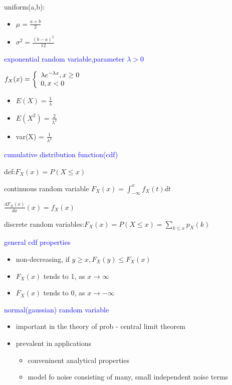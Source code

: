 uniform(a,b):
\begin{itemize}
    \item $\mu=\frac{a+b}{2}$
    \item $\sigma^2=\frac{(b-a)^2}{12}$
\end{itemize}

\textcolor{blue}{exponential random variable,parameter $\lambda> 0$}

$f_X(x)=\left\{ \begin{array}[pos]{l}
    \lambda e^{-\lambda x},x\geq 0\\
    0,x <0
\end{array}\right.$

\begin{itemize}
    \item $E(X)=\frac{1}{\lambda}$
    \item $E(X^2)=\frac{2}{\lambda^2}$
    \item var(X) = $\frac{1}{\lambda^2}$
\end{itemize}


\textcolor{blue}{cumulative distribution function(cdf)}

def:$F_X(x)=P(X\le x)$

continuous random variable $F_X(x)=\int_{-\infty}^x f_X(t)dt$

$\frac{d F_X(x)}{dx}(x)=f_X(x)$


discrete random variables:$F_X(x)=P(X\le x) = \sum _{k\leq x}p_X(k)$


\textcolor{blue}{general cdf properties}

\begin{itemize}
    \item non-decreasing, if $y\ge x, F_X(y)\leq F_X(x)$
    \item $F_X(x)$ tends to 1, as $x \to \infty$
    \item $F_X(x)$ tends to 0, as $x \to -\infty$
\end{itemize}


\textcolor{blue}{normal(gaussian) random variable}

\begin{itemize}
    \item important in the theory of prob - central limit theorem
    \item prevalent in applications
    \begin{itemize}
        \item conveninent analytical properties
        \item model fo noise consisting of many, small independent noise terms
    \end{itemize}
\end{itemize}


